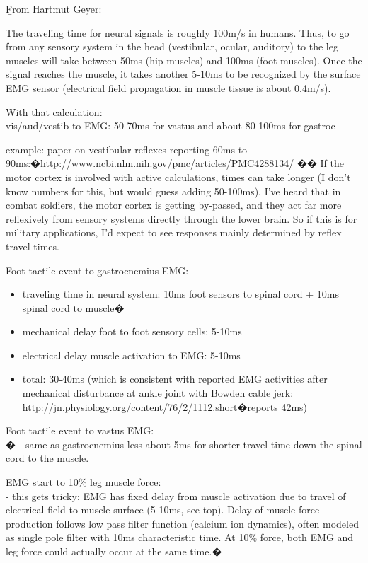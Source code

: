 \documentclass[letterpaper,12pt,fullpage]{article}
\begin{document}
{\b From Hartmut Geyer:}

The traveling time for neural signals is roughly 100m/s in humans.
Thus, to go from any sensory system in the head (vestibular, ocular,
auditory) to the leg muscles will take between 50ms (hip muscles) and
100ms (foot muscles). Once the signal reaches the muscle, it takes
another 5-10ms to be recognized by the surface EMG sensor (electrical
field propagation in muscle tissue is about 0.4m/s).

With that calculation:\\
vis/aud/vestib to EMG: 50-70ms for vastus and about 80-100ms for
gastroc

example: paper on vestibular reflexes reporting 60ms to
90ms:�\url{http://www.ncbi.nlm.nih.gov/pmc/articles/PMC4288134/}
��
If the motor cortex is involved with active calculations, times can
take longer (I don't know numbers for this, but would guess adding
50-100ms). I've heard that in combat soldiers, the motor cortex is
getting by-passed, and they act far more reflexively from sensory
systems directly through the lower brain. So if this is for military
applications, I'd expect to see responses mainly determined by
reflex travel times.

Foot tactile event to gastrocnemius EMG:
\begin{itemize}
\item
traveling time in neural system: 10ms foot sensors to spinal cord +
10ms spinal cord to muscle�
\item
mechanical delay foot to foot sensory cells: 5-10ms
\item
electrical delay muscle activation to EMG: 5-10ms
\item
total: 30-40ms (which is consistent with reported EMG activities
after mechanical disturbance at ankle joint with Bowden cable jerk:
\url{http://jn.physiology.org/content/76/2/1112.short�reports 42ms)}
\end{itemize}

Foot tactile event to vastus EMG:\\�
- same as gastrocnemius less about 5ms for shorter travel time down
the spinal cord to the muscle.

EMG start to 10\% leg muscle force:\\
- this gets tricky: EMG has fixed delay from muscle activation due to
travel of electrical field to muscle surface (5-10ms, see top). Delay
of muscle force production follows low pass filter function (calcium
ion dynamics), often modeled as single pole filter with 10ms
characteristic time. At 10\% force, both EMG and leg force could
actually occur at the same time.�
\end{document}
